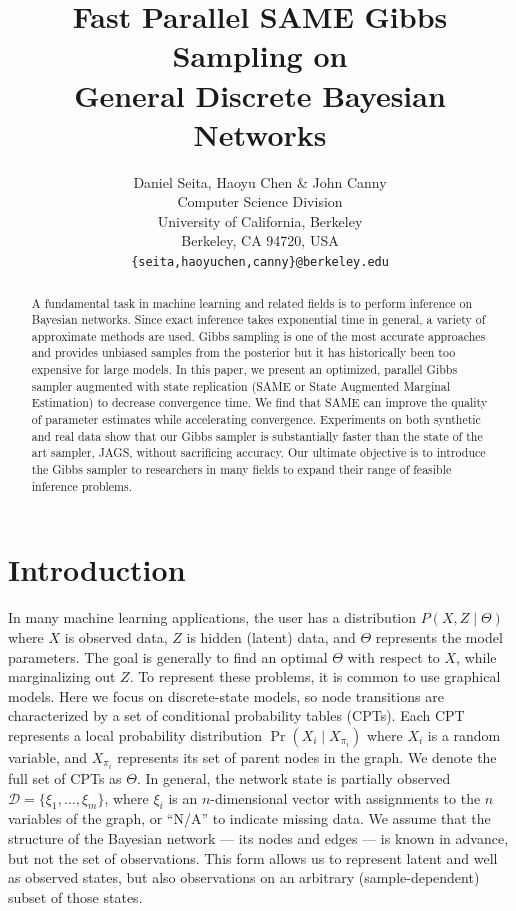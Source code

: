 \documentclass{article} %
\title{Fast Parallel SAME Gibbs Sampling on \\ General Discrete Bayesian Networks}
\author{Daniel Seita, Haoyu Chen \& John Canny \\
Computer Science Division \\
University of California, Berkeley \\
Berkeley, CA 94720, USA \\
\texttt{\{seita,haoyuchen,canny\}@berkeley.edu}
}
\begin{document}
\maketitle

\begin{abstract}
A fundamental task in machine learning and related fields is to
perform inference on Bayesian networks. Since exact inference takes
exponential time in general, a variety of approximate methods are
used.  Gibbs sampling is one of the most accurate approaches and
provides unbiased samples from the posterior but it has historically
been too expensive for large models. In this paper, we present an
optimized, parallel Gibbs sampler augmented with state replication (SAME or State
Augmented Marginal Estimation) to decrease convergence time. We find
that SAME can improve the quality of parameter estimates while accelerating
convergence.  Experiments on both synthetic and real data
show that our Gibbs sampler is substantially faster than the state of
the art sampler, JAGS, without sacrificing accuracy. Our ultimate
objective is to introduce the Gibbs sampler to researchers in many
fields to expand their range of feasible inference problems.
\end{abstract}




\section{Introduction}\label{sec:intro}

In many machine learning applications, the user has a distribution
$P(X,Z \mid \Theta)$ where $X$ is observed data, $Z$ is hidden
(latent) data, and $\Theta$ represents the model parameters. The goal
is generally to find an optimal $\Theta$ with respect to $X$, while
marginalizing out $Z$. To represent these problems, it is common to
use graphical models.  Here we focus on discrete-state models,
so node transitions are characterized by a set of conditional
probability tables (CPTs). Each CPT represents a local probability
distribution $\Pr(X_i \mid X_{\pi_i})$ where $X_i$ is a random
variable, and $X_{\pi_i}$ represents its set of parent nodes in the
graph. We denote the full set of CPTs as $\Theta$.  In general, the
network state is partially observed $\mathcal{D} = \{\xi_1, \ldots,
\xi_m\}$, where $\xi_i$ is an $n$-dimensional vector with assignments
to the $n$ variables of the graph, or ``N/A'' to indicate missing
data. We assume that the structure of the Bayesian network --- its
nodes and edges --- is known in advance, but not the set of
observations. This form allows us to represent latent and well as
observed states, but also observations on an arbitrary
(sample-dependent) subset of those states.
\end{document}
